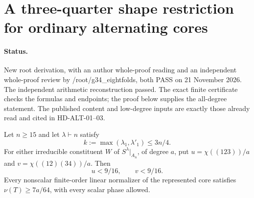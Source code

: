 \section{A three-quarter shape restriction for ordinary alternating cores}
\label{sec:ordinary-alternating-three-quarters}

\paragraph{Status.}
New root derivation, with an author whole-proof reading and an
independent whole-proof review by /root/g34\_eightfolds, both PASS
on 21 November 2026. The independent arithmetic reconstruction passed. The exact finite certificate checks the
formulas and endpoints; the proof below supplies the all-degree
statement. The published content and low-degree inputs are exactly
those already read and cited in HD-ALT-01--03.

\begin{lemma}
\label{HD-ALT-04a}
Let $n\ge15$ and let $\lambda\vdash n$ satisfy
\[
                k:=\max(\lambda_1,\lambda'_1)\le3n/4.
                                                               \tag{ALTQ.1}
\]
For either irreducible constituent $W$ of $S^\lambda|_{A_n}$,
of degree $a$, put $u=\chi((123))/a$ and
$v=\chi((12)(34))/a$. Then
\[
                u<9/16,\qquad v<9/16.
                                                               \tag{ALTQ.2}
\]
Every nonscalar finite-order linear normalizer of the represented
core satisfies $\nu(T)\ge7a/64$, with every scalar phase allowed.
\end{lemma}

